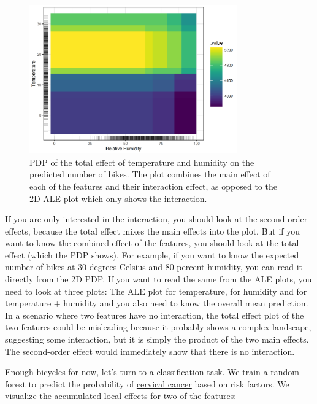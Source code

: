 \documentclass[
  10pt,
]{scrbook}
\begin{document}
\begin{figure}

{\centering \includegraphics[width=0.8\textwidth]{images/pdp-bike-vs-ale-2D-1} 

}

\caption{PDP of the total effect of temperature and humidity on the predicted number of bikes. The plot combines the main effect of each of the features and their interaction effect, as opposed to the 2D-ALE plot which only shows the interaction.}\label{fig:pdp-bike-vs-ale-2D}
\end{figure}

If you are only interested in the interaction, you should look at the second-order effects, because the total effect mixes the main effects into the plot.
But if you want to know the combined effect of the features, you should look at the total effect (which the PDP shows).
For example, if you want to know the expected number of bikes at 30 degrees Celsius and 80 percent humidity, you can read it directly from the 2D PDP.
If you want to read the same from the ALE plots, you need to look at three plots:
The ALE plot for temperature, for humidity and for temperature + humidity and you also need to know the overall mean prediction.
In a scenario where two features have no interaction, the total effect plot of the two features could be misleading because it probably shows a complex landscape, suggesting some interaction, but it is simply the product of the two main effects.
The second-order effect would immediately show that there is no interaction.

Enough bicycles for now, let's turn to a classification task.
We train a random forest to predict the probability of \protect\hyperlink{cervical}{cervical cancer} based on risk factors.
We visualize the accumulated local effects for two of the features:
\end{document}

